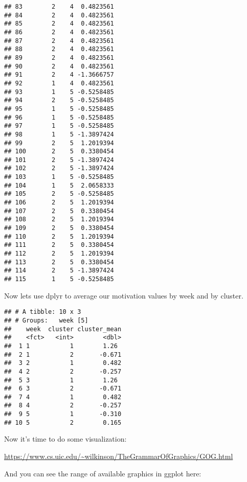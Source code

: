 \documentclass[]{article}
\newenvironment{Shaded}{\begin{snugshade}}{\end{snugshade}}
\newcommand{\CommentTok}[1]{\textcolor[rgb]{0.56,0.35,0.01}{\textit{#1}}}
\newcommand{\DataTypeTok}[1]{\textcolor[rgb]{0.13,0.29,0.53}{#1}}
\newcommand{\KeywordTok}[1]{\textcolor[rgb]{0.13,0.29,0.53}{\textbf{#1}}}
\newcommand{\NormalTok}[1]{#1}
\newcommand{\OperatorTok}[1]{\textcolor[rgb]{0.81,0.36,0.00}{\textbf{#1}}}
\newcommand{\StringTok}[1]{\textcolor[rgb]{0.31,0.60,0.02}{#1}}
\begin{document}
\begin{verbatim}
## 83        2    4  0.4823561
## 84        2    4  0.4823561
## 85        2    4  0.4823561
## 86        2    4  0.4823561
## 87        2    4  0.4823561
## 88        2    4  0.4823561
## 89        2    4  0.4823561
## 90        2    4  0.4823561
## 91        2    4 -1.3666757
## 92        1    4  0.4823561
## 93        1    5 -0.5258485
## 94        2    5 -0.5258485
## 95        1    5 -0.5258485
## 96        1    5 -0.5258485
## 97        1    5 -0.5258485
## 98        1    5 -1.3897424
## 99        2    5  1.2019394
## 100       2    5  0.3380454
## 101       2    5 -1.3897424
## 102       2    5 -1.3897424
## 103       1    5 -0.5258485
## 104       1    5  2.0658333
## 105       2    5 -0.5258485
## 106       2    5  1.2019394
## 107       2    5  0.3380454
## 108       2    5  1.2019394
## 109       2    5  0.3380454
## 110       2    5  1.2019394
## 111       2    5  0.3380454
## 112       2    5  1.2019394
## 113       2    5  0.3380454
## 114       2    5 -1.3897424
## 115       1    5 -0.5258485
\end{verbatim}

Now lets use dplyr to average our motivation values by week and by
cluster.

\begin{Shaded}
\end{Shaded}

\begin{verbatim}
## # A tibble: 10 x 3
## # Groups:   week [5]
##    week  cluster cluster_mean
##    <fct>   <int>        <dbl>
##  1 1           1        1.26 
##  2 1           2       -0.671
##  3 2           1        0.482
##  4 2           2       -0.257
##  5 3           1        1.26 
##  6 3           2       -0.671
##  7 4           1        0.482
##  8 4           2       -0.257
##  9 5           1       -0.310
## 10 5           2        0.165
\end{verbatim}

Now it's time to do some visualization:

\url{https://www.cs.uic.edu/~wilkinson/TheGrammarOfGraphics/GOG.html}

And you can see the range of available graphics in ggplot here:
\end{document}
